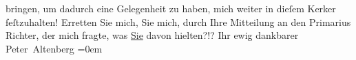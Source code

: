 \begin{ledgroupsized}[t]{13cm}
                    bringen, um dadurch eine {\pb}Gelegenheit
                    zu haben, mich weiter in dieſem Kerker feſtzuhalten!\pend
           \pstart
           Erretten Sie mich,  Sie mich, durch Ihre
                    Mitteilung an den Primarius Richter, der
                    mich fragte, was \uline{Sie} davon hielten?!?\pend
           \pstart
           Ihr ewig dankbarer{\\[\baselineskip]}\spacefill\mbox{Peter Altenberg}\pend
           \leftskip=0em{}\endnumbering{}\end{ledgroupsized}  \newcommand{\dateiname}{L02133}\newcommand{\titel}{Peter Altenberg an Arthur Schnitzler, [26. 4. 1913]}\newcommand{\editorInnen}{Martin Anton Müller und Gerd-Hermann Susen}
            \footnotesize
\begin{ledgroupsized}[t]{11.5cm}
\end{ledgroupsized}
         
      